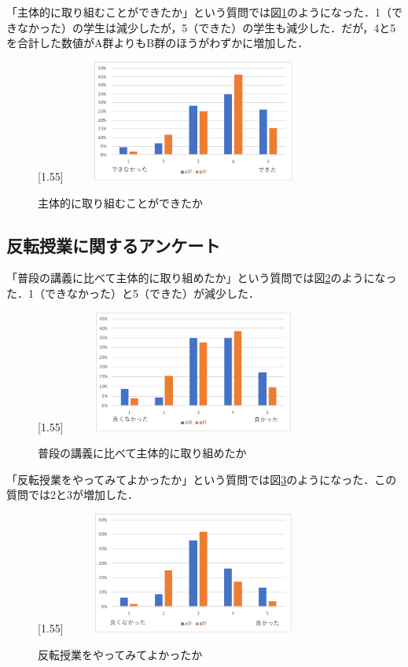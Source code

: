 \documentclass[a4j,11pt]{jsarticle}
\begin{document}
「主体的に取り組むことができたか」という質問では図\ref{anke8}のようになった．1（できなかった）の学生は減少したが，5（できた）の学生も減少した．だが，4と5を合計した数値がA群よりもB群のほうがわずかに増加した．

\begin{figure}[h]
\begin{center}
\scalebox{1.2}[1.55]{
 \includegraphics[clip,width=85mm,height=40mm]{anke8.pdf}
 }
\end{center}
 \caption{主体的に取り組むことができたか}
 \label{anke8}
\end{figure}



\newpage
\subsection{反転授業に関するアンケート}

「普段の講義に比べて主体的に取り組めたか」という質問では図\ref{anke9}のようになった．1（できなかった）と5（できた）が減少した．

\begin{figure}[h]
\begin{center}
\scalebox{1.2}[1.55]{
 \includegraphics[clip,width=85mm,height=40mm]{anke9.pdf}
 }
\end{center}
 \caption{普段の講義に比べて主体的に取り組めたか}
 \label{anke9}
\end{figure}

「反転授業をやってみてよかったか」という質問では図\ref{anke10}のようになった．この質問では2と3が増加した．

\begin{figure}[h]
\begin{center}
\scalebox{1.2}[1.55]{
 \includegraphics[clip,width=85mm,height=40mm]{anke10.pdf}
 }
\end{center}
 \caption{反転授業をやってみてよかったか}
 \label{anke10}
\end{figure}
\end{document}
